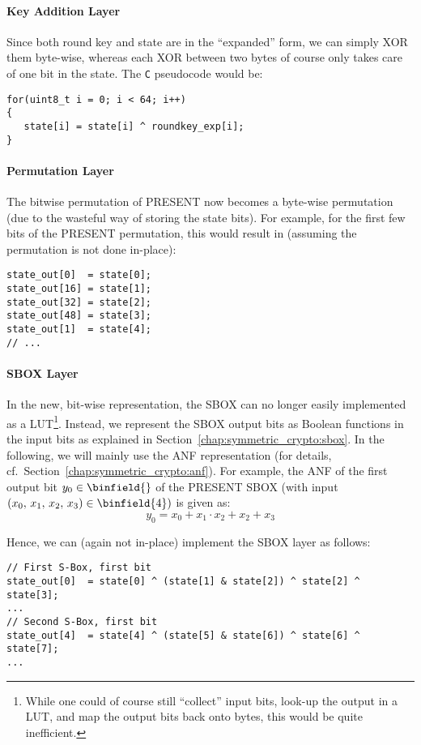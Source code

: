 \paragraph{Key Addition Layer}
Since both round key and state are in the ``expanded'' form, we can simply XOR them byte-wise, whereas each XOR between two bytes of course only takes care of one bit in the state. The \verb+C+ pseudocode would be:

\begin{lstlisting}
for(uint8_t i = 0; i < 64; i++)
{
   state[i] = state[i] ^ roundkey_exp[i];
}
\end{lstlisting}

\paragraph{Permutation Layer}
The bitwise permutation of PRESENT now becomes a byte-wise permutation (due to the wasteful way of storing the state bits). For example, for the first few bits of the PRESENT permutation, this would result in (assuming the permutation is not done in-place):
\lstset{language=C}
\begin{lstlisting}
state_out[0]  = state[0];
state_out[16] = state[1];
state_out[32] = state[2];
state_out[48] = state[3];
state_out[1]  = state[4];
// ...
\end{lstlisting}

\paragraph{\ac{SBOX} Layer}
In the new, bit-wise representation, the \ac{SBOX} can no longer easily implemented as a \ac{LUT}\footnote{While one could of course still ``collect'' input bits, look-up the output in a \ac{LUT}, and map the output bits back onto bytes, this would be quite inefficient.}. Instead, we represent the \ac{SBOX} output bits as Boolean functions in the input bits as explained in Section~\ref{chap:symmetric_crypto:sbox}. In the following, we will mainly use the \acl{ANF} representation (for details, cf.~Section~\ref{chap:symmetric_crypto:anf}). For example, the \ac{ANF} of the first output bit $y_0 \in \binfield{}$ of the PRESENT \ac{SBOX} (with input $\left(x_0,\,x_1,\,x_2,\,x_3\right) \in \binfield{4})$ is given as:
$$
y_0 = x_0 + x_1 \cdot x_2 + x_2 + x_3
$$

Hence, we can (again not in-place) implement the \ac{SBOX} layer as follows:
\lstset{language=C}
\begin{lstlisting}
// First S-Box, first bit
state_out[0]  = state[0] ^ (state[1] & state[2]) ^ state[2] ^ state[3];
...
// Second S-Box, first bit
state_out[4]  = state[4] ^ (state[5] & state[6]) ^ state[6] ^ state[7];
...
\end{lstlisting}

